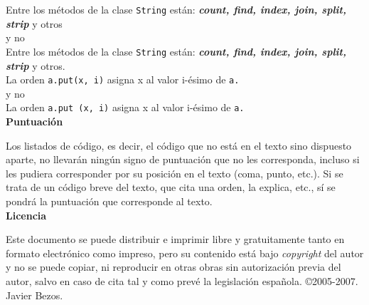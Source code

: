 \small Entre los métodos de la clase \texttt{String} están: \textbf{\textit{count, find, index, join, split, strip}}
\indent y otros\\

\indent\indent y no\\

Entre los métodos de la clase \texttt{String} están: \textbf{\textit{count, find, index, join, split, strip}}
\indent y otros.\\

La orden \verb|a.put(x, i)| asigna x al valor i-ésimo de \verb|a.|\\


\indent\indent y no\\

La orden \verb|a.put (x, i)| asigna x al valor i-ésimo de \verb|a.|\\

\normalsize
\noindent\textbf{Puntuación}

Los listados de código, es decir, el código que no está en el texto sino dispuesto
aparte, no llevarán ningún signo de puntuación que no les corresponda, incluso si
les pudiera corresponder por su posición en el texto (coma, punto, etc.). Si se trata
de un código breve del texto, que cita una orden, la explica, etc., sí se pondrá la
puntuación que corresponde al texto.\\

\noindent\textbf{Licencia}

Este documento se puede distribuir e imprimir libre y gratuitamente tanto en formato
electrónico como impreso, pero su contenido está bajo \textit{copyright} del autor y no
se puede copiar, ni reproducir en otras obras sin autorización previa del autor, salvo
en caso de cita tal y como prevé la legislación española.
\copyright 2005-2007. Javier Bezos.

